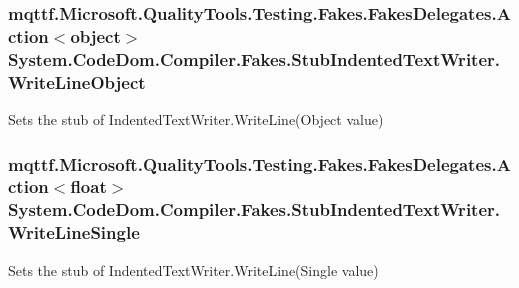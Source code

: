 \hypertarget{class_system_1_1_code_dom_1_1_compiler_1_1_fakes_1_1_stub_indented_text_writer_acd9414bf46444087c28ae18b21f4f0a5}{
\subsubsection[{Write\-Line\-Object}]{\setlength{\rightskip}{0pt plus 5cm}mqttf.\-Microsoft.\-Quality\-Tools.\-Testing.\-Fakes.\-Fakes\-Delegates.\-Action$<$object$>$ System.\-Code\-Dom.\-Compiler.\-Fakes.\-Stub\-Indented\-Text\-Writer.\-Write\-Line\-Object}}\label{class_system_1_1_code_dom_1_1_compiler_1_1_fakes_1_1_stub_indented_text_writer_acd9414bf46444087c28ae18b21f4f0a5}


Sets the stub of Indented\-Text\-Writer.\-Write\-Line(\-Object value)

\hypertarget{class_system_1_1_code_dom_1_1_compiler_1_1_fakes_1_1_stub_indented_text_writer_ab3e498070e8dec2b3e3d7588771d14bd}{
\subsubsection[{Write\-Line\-Single}]{\setlength{\rightskip}{0pt plus 5cm}mqttf.\-Microsoft.\-Quality\-Tools.\-Testing.\-Fakes.\-Fakes\-Delegates.\-Action$<$float$>$ System.\-Code\-Dom.\-Compiler.\-Fakes.\-Stub\-Indented\-Text\-Writer.\-Write\-Line\-Single}}\label{class_system_1_1_code_dom_1_1_compiler_1_1_fakes_1_1_stub_indented_text_writer_ab3e498070e8dec2b3e3d7588771d14bd}


Sets the stub of Indented\-Text\-Writer.\-Write\-Line(\-Single value)

